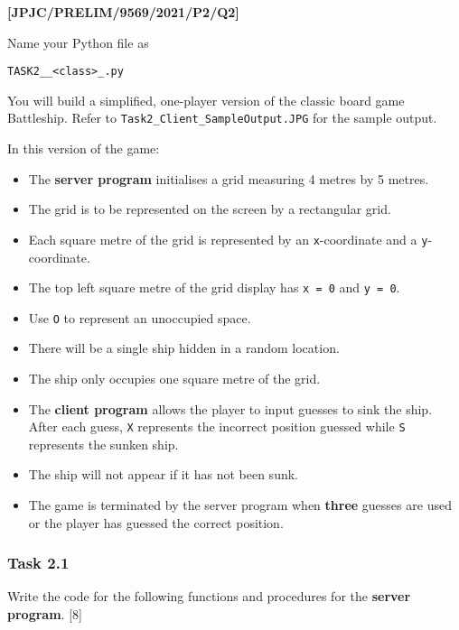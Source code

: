 \item \textbf{{[}JPJC/PRELIM/9569/2021/P2/Q2{]} }

Name your Python file as 

\texttt{TASK2\_<your name>\_<class>\_<index number>.py} 

You will build a simplified, one-player version of the classic board
game Battleship. Refer to \texttt{Task2\_Client\_SampleOutput.JPG}
for the sample output. 

In this version of the game: 
\begin{itemize}
\item The\textbf{ server program} initialises a grid measuring 4 metres
by 5 metres. 
\item The grid is to be represented on the screen by a rectangular grid. 
\item Each square metre of the grid is represented by an \texttt{x}-coordinate
and a \texttt{y}-coordinate. 
\item The top left square metre of the grid display has \texttt{x = 0} and
\texttt{y = 0}. 
\item Use \textquotedbl\texttt{O}\textquotedbl{} to represent an unoccupied
space. 
\item There will be a single ship hidden in a random location. 
\item The ship only occupies one square metre of the grid. 
\item The \textbf{client program} allows the player to input guesses to
sink the ship. After each guess, \textquotedbl\texttt{X}\textquotedbl{}
represents the incorrect position guessed while \textquotedbl\texttt{S}\textquotedbl{}
represents the sunken ship. 
\item The ship will not appear if it has not been sunk. 
\item The game is terminated by the server program when \textbf{three} guesses
are used or the player has guessed the correct position. 
\end{itemize}

\subsubsection*{Task 2.1 }

Write the code for the following functions and procedures for the
\textbf{server program}. \hfill{}{[}8{]}

